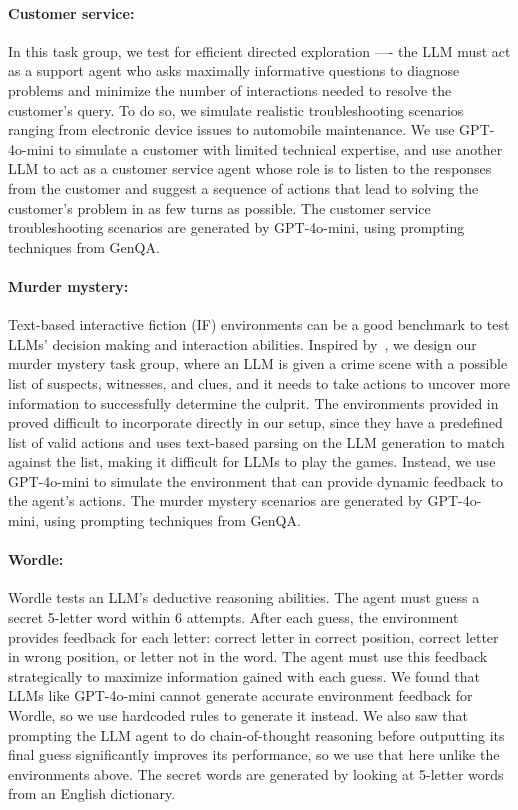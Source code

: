 \documentclass{article}
\theoremstyle{plain}
\theoremstyle{definition}
\theoremstyle{remark}
\begin{document}
\paragraph{Customer service: } In this task group, we test for efficient directed exploration ---- the LLM must act as a support agent who asks maximally informative questions to diagnose problems and minimize the number of interactions needed to resolve the customer's query. To do so, we simulate realistic troubleshooting scenarios ranging from electronic device issues to automobile maintenance. We use GPT-4o-mini to simulate a customer with limited technical expertise, and use another LLM to act as a customer service agent whose role is to listen to the responses from the customer and suggest a sequence of actions that lead to solving the customer's problem in as few turns as possible. The customer service troubleshooting scenarios are generated by GPT-4o-mini, using prompting techniques from GenQA.
\paragraph{Murder mystery: } Text-based interactive fiction (IF) environments can be a good benchmark to test LLMs' decision making and interaction abilities. Inspired by~\citet{hausknecht2020interactivefictionenvironmentscolossal}, we design our murder mystery task group, where an LLM is given a crime scene with a possible list of suspects, witnesses, and clues, and it needs to take actions to uncover more information to successfully determine the culprit.  The environments provided in ~\citet{hausknecht2020interactivefictionenvironmentscolossal} proved difficult to incorporate directly in our setup, since they have a predefined list of valid actions and uses text-based parsing on the LLM generation to match against the list, making it difficult for LLMs to play the games. Instead, we use GPT-4o-mini to simulate the environment that can provide dynamic feedback to the agent's actions. The murder mystery scenarios are generated by GPT-4o-mini, using prompting techniques from GenQA.
\paragraph{Wordle: } Wordle tests an LLM's deductive reasoning abilities. The agent must guess a secret 5-letter word within 6 attempts. After each guess, the environment provides feedback for each letter: correct letter in correct position, correct letter in wrong position, or letter not in the word.
The agent must use this feedback strategically to maximize information gained with each guess. We found that LLMs like GPT-4o-mini cannot generate accurate environment feedback for Wordle, so we use hardcoded rules to generate it instead. We also saw that prompting the LLM agent to do chain-of-thought reasoning before outputting its final guess significantly improves its performance, so we use that here unlike the environments above. The secret words are generated by looking at 5-letter words from an English dictionary.
\end{document}
